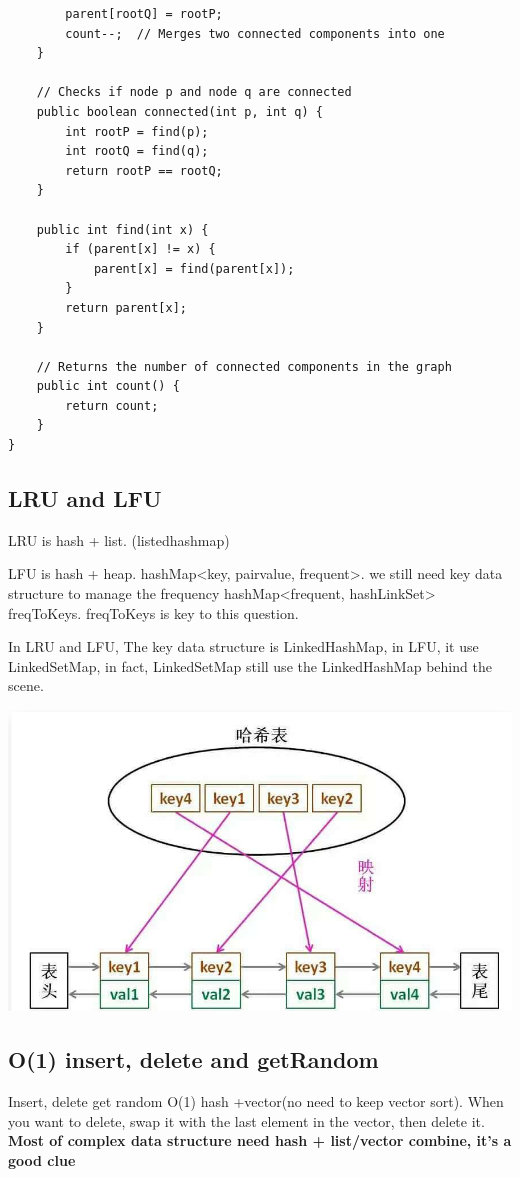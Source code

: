 \documentclass[a4paper,11pt,twoside]{book}
\begin{document}
\begin{itemize}
\begin{lstlisting}
		parent[rootQ] = rootP;
		count--;  // Merges two connected components into one
	}
	
	// Checks if node p and node q are connected
	public boolean connected(int p, int q) {
		int rootP = find(p);
		int rootQ = find(q);
		return rootP == rootQ;
	}
	
	public int find(int x) {
		if (parent[x] != x) {
			parent[x] = find(parent[x]);
		}
		return parent[x];
	}
	
	// Returns the number of connected components in the graph
	public int count() {
		return count;
	}
}
\end{lstlisting}
		
	\end{itemize}
	
	
\subsection{LRU and LFU}

	\par  LRU is hash + list. (listedhashmap)
	\par LFU is hash + heap. hashMap<key, pair{value, frequent}>. we still need key data structure to manage the frequency hashMap<frequent, hashLinkSet> freqToKeys.  freqToKeys is key to this question. 
	
	\par In LRU and LFU, The key data structure is LinkedHashMap, in LFU, it use LinkedSetMap, in fact, LinkedSetMap still use the LinkedHashMap behind the scene. 
\begin{center}
	\includegraphics[width=0.7\linewidth]{pics/LinkedHashMap}
\end{center}
	
	
\subsection{O(1) insert, delete and getRandom}
Insert, delete get random O(1)  hash +vector(no need to keep vector sort). When you want to delete, swap it with the last element in the vector, then delete it.  \textbf{Most of complex data structure need hash + list/vector combine, it's a good clue}
	
\end{document}
